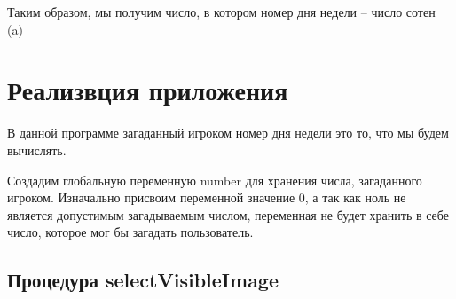 Таким образом, мы получим число, в котором номер дня недели – число сотен ({{a}})

\section{Реализвция приложения}

В данной программе загаданный игроком номер дня недели это то, что мы будем вычислять.

Создадим глобальную переменную number для хранения числа, загаданного игроком. Изначально присвоим переменной значение 0, а так как ноль не является допустимым загадываемым числом, переменная не будет хранить в себе число, которое мог бы загадать пользователь.

\subsection{Процедура selectVisibleImage}

